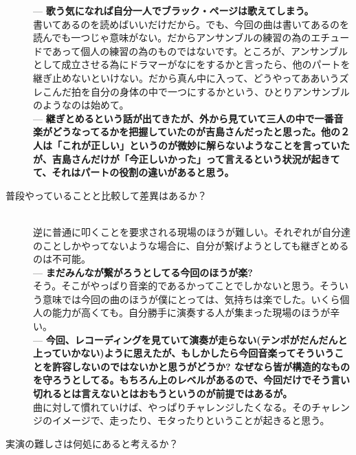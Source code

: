 \documentclass[uplatex,dvipdfmx]{ujarticle}
\begin{document}
\begin{description}
--- {\bf 歌う気になれば自分一人でブラック・ページは歌えてしまう。}\\

書いてあるのを読めばいいだけだから。でも、今回の曲は書いてあるのを読んでも一つじゃ意味がない。だからアンサンブルの練習の為のエチュードであって個人の練習の為のものではないです。ところが、アンサンブルとして成立させる為にドラマーがなにをするかと言ったら、他のパートを継ぎ止めないといけない。だから真ん中に入って、どうやってああいうズレこんだ拍を自分の身体の中で一つにするかという、ひとりアンサンブルのようなのは始めて。\\

--- {\bf 継ぎとめるという話が出てきたが、外から見ていて三人の中で一番音楽がどうなってるかを把握していたのが吉島さんだったと思った。他の２人は「これが正しい」というのが微妙に解らないようなことを言っていたが、吉島さんだけが「今正しいかった」って言えるという状況が起きてて、それはパートの役割の違いがあると思う。}

\item [普段やっていることと比較して差異はあるか？]\mbox{}\\

逆に普通に叩くことを要求される現場のほうが難しい。それぞれが自分達のことしかやってないような場合に、自分が繋げようとしても継ぎとめるのは不可能。\\

--- {\bf まだみんなが繋がろうとしてる今回のほうが楽?}\\

そう。そこがやっぱり音楽的であるかってことでしかないと思う。そういう意味では今回の曲のほうが僕にとっては、気持ちは楽でした。いくら個人の能力が高くても。自分勝手に演奏する人が集まった現場のほうが辛い。\\

--- {\bf 今回、レコーディングを見ていて演奏が走らない(テンポがだんだんと上っていかない)ように思えたが、もしかしたら今回音楽ってそういうことを許容しないのではないかと思うがどうか? なぜなら皆が構造的なものを守ろうとしてる。もちろん上のレベルがあるので、今回だけでそう言い切れるとは言えないとはおもうというのが前提ではあるが。}\\

曲に対して慣れていけば、やっぱりチャレンジしたくなる。そのチャレンジのイメージで、走ったり、モタったりということが起きると思う。\\

\item [実演の難しさは何処にあると考えるか？]\mbox{}\\


\end{description}
\end{document}
